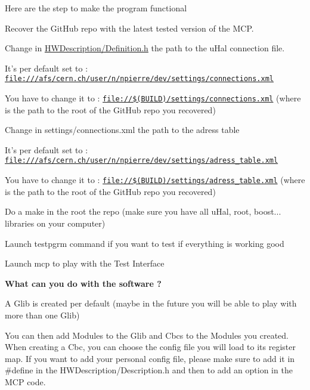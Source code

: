 Here are the step to make the program functional


\begin{DoxyEnumerate}
\item Recover the Git\-Hub repo with the latest tested version of the M\-C\-P.
\item Change in \hyperlink{_definition_8h}{H\-W\-Description/\-Definition.\-h} the path to the u\-Hal connection file.
\begin{DoxyItemize}
\item It's per default set to \-: \href{file:///afs/cern.ch/user/n/npierre/dev/settings/connections.xml}{\tt file\-:///afs/cern.\-ch/user/n/npierre/dev/settings/connections.\-xml}
\item You have to change it to \-: \href{file://$(BUILD)/settings/connections.xml}{\tt file\-://\$(\-B\-U\-I\-L\-D)/settings/connections.\-xml} (where  is the path to the root of the Git\-Hub repo you recovered)
\end{DoxyItemize}
\item Change in settings/connections.\-xml the path to the adress table
\begin{DoxyItemize}
\item It's per default set to \-: \href{file:///afs/cern.ch/user/n/npierre/dev/settings/adress_table.xml}{\tt file\-:///afs/cern.\-ch/user/n/npierre/dev/settings/adress\-\_\-table.\-xml}
\item You have to change it to \-: \href{file://$(BUILD)/settings/adress_table.xml}{\tt file\-://\$(\-B\-U\-I\-L\-D)/settings/adress\-\_\-table.\-xml} (where  is the path to the root of the Git\-Hub repo you recovered)
\end{DoxyItemize}
\item Do a make in the root the repo (make sure you have all u\-Hal, root, boost... libraries on your computer)
\item Launch testpgrm command if you want to test if everything is working good
\item Launch mcp to play with the Test Interface \par
 \par
 {\bfseries What can you do with the software ?}
\end{DoxyEnumerate}

A Glib is created per default (maybe in the future you will be able to play with more than one Glib)

You can then add Modules to the Glib and Cbcs to the Modules you created. When creating a Cbc, you can choose the config file you will load to its register map. If you want to add your personal config file, please make sure to add it in \#define in the H\-W\-Description/\-Description.\-h and then to add an option in the M\-C\-P code.

